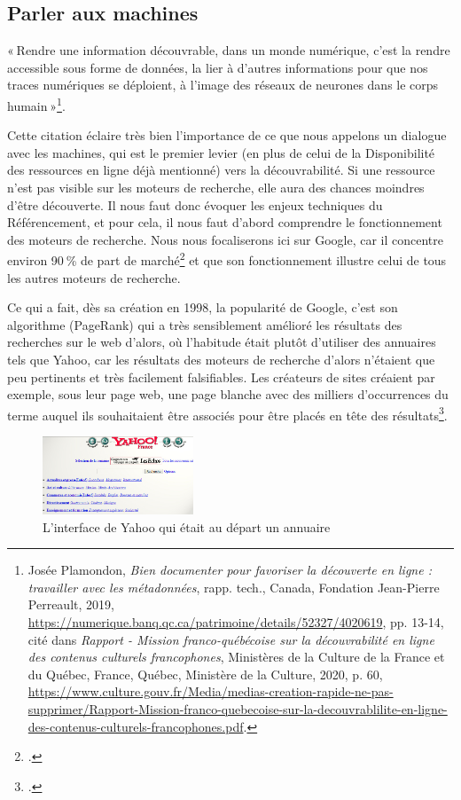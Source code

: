 \subsection*{Parler aux machines}
« Rendre une information découvrable, dans un monde numérique, c’est la rendre accessible sous forme de données, la lier à d’autres informations pour que nos traces numériques se déploient, à l’image des réseaux de neurones dans le corps humain »\footnote{Josée Plamondon, \textit{Bien documenter pour favoriser la découverte en ligne : travailler avec les métadonnées}, rapp. tech., Canada, Fondation Jean-Pierre Perreault, 2019, \url{https://numerique.banq.qc.ca/patrimoine/details/52327/4020619}, pp. 13-14, cité dans \textit{Rapport - Mission franco-québécoise sur la découvrabilité en ligne des contenus culturels francophones}, Ministères de la Culture de la France et du Québec, France, Québec, Ministère de la Culture, 2020, p. 60, \url{https://www.culture.gouv.fr/Media/medias-creation-rapide-ne-pas-supprimer/Rapport-Mission-franco-quebecoise-sur-la-decouvrablilite-en-ligne-des-contenus-culturels-francophones.pdf}.}.

Cette citation éclaire très bien l’importance de ce que nous appelons un dialogue avec les machines, qui est le premier levier (en plus de celui de la Disponibilité des ressources en ligne déjà mentionné) vers la découvrabilité. Si une ressource n’est pas visible sur les moteurs de recherche, elle aura des chances moindres d’être découverte. Il nous faut donc évoquer les enjeux techniques du Référencement, et pour cela, il nous faut d’abord comprendre le fonctionnement des moteurs de recherche. Nous nous focaliserons ici sur Google, car il concentre environ 90 \% de part de marché\footcite{zotero-245} et que son fonctionnement illustre celui de tous les autres moteurs de recherche. 

Ce qui a fait, dès sa création en 1998, la popularité de Google, c’est son algorithme (PageRank) qui a très sensiblement amélioré les résultats des recherches sur le web d’alors, où l’habitude était plutôt d’utiliser des annuaires tels que Yahoo, car les résultats des moteurs de recherche d’alors n’étaient que peu pertinents et très facilement falsifiables. Les créateurs de sites créaient par exemple, sous leur page web, une page blanche avec des milliers d’occurrences du terme auquel ils souhaitaient être associés pour être placés en tête des résultats\footcite[§ 4]{cardon2013}.


\begin{figure}[h!]
	\centering
	\includegraphics[width=0.4\textwidth]{images/image2.jpg}
	\caption{L'interface de Yahoo qui était au départ un annuaire }
	\label{fig:image2}
\end{figure}


